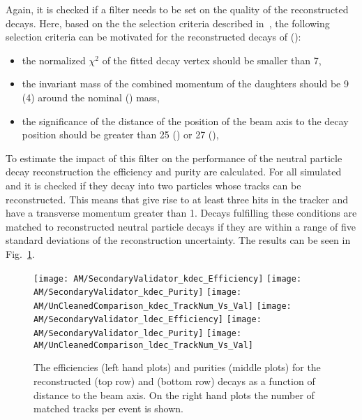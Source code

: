 Again, it is checked if a filter needs to be set on the quality of the reconstructed decays. Here, based on the the selection criteria described in~\cite{v0paper}, the following selection criteria can be motivated for the reconstructed decays of \PKzS{} (\PgL{}):
\begin{itemize}
    \item the normalized $\chi^{2}$ of the fitted decay vertex should be smaller than 7,
    \item the invariant mass of the combined momentum of the daughters should be 9\MeVcc{} (4\MeVcc{}) around the nominal \PKzS{} (\PgL{}) mass,
    \item the significance of the distance of the position of the beam axis to the decay position should be greater than 25 (\PKzS{}) or 27 (\PgL{}),
\end{itemize}
To estimate the impact of this filter on the performance of the neutral particle decay reconstruction the efficiency and purity are calculated. For all simulated \PKzS{} and \PgL{} it is checked if they decay into two particles whose tracks can be reconstructed. This means that give rise to at least three hits in the tracker and have a transverse momentum greater than 1\GeV. Decays fulfilling these conditions are matched to reconstructed neutral particle decays if they are within a range of five standard deviations of the reconstruction uncertainty. The results can be seen in Fig.~\ref{plot:AMWFSVdecEffAndPurDC}.

\begin{figure}[!ht]
    \centering
    \texttt{[image: AM/SecondaryValidator\_kdec\_Efficiency]}
    \texttt{[image: AM/SecondaryValidator\_kdec\_Purity]}
    \texttt{[image: AM/UnCleanedComparison\_kdec\_TrackNum\_Vs\_Val]}
    \newline
    \texttt{[image: AM/SecondaryValidator\_ldec\_Efficiency]}
    \texttt{[image: AM/SecondaryValidator\_ldec\_Purity]}
    \texttt{[image: AM/UnCleanedComparison\_ldec\_TrackNum\_Vs\_Val]}
    \caption[Efficiency and purity of the reconstructed \PKzS{} and \PgL{} decays as a function of distance to the beam axis and number of matched tracks]{The efficiencies (left hand plots) and purities (middle plots) for the reconstructed \PKzS{} (top row) and \PgL{} (bottom row) decays as a function of distance to the beam axis. On the right hand plots the number of matched tracks per event is shown. \label{plot:AMWFSVdecEffAndPurDC}}
\end{figure}

